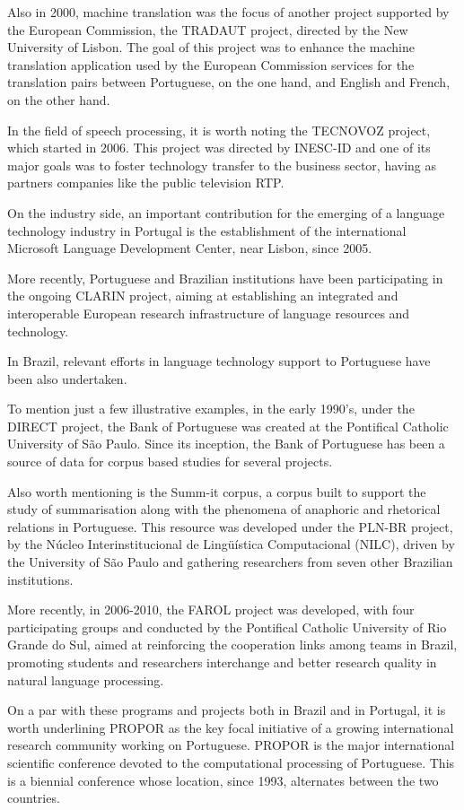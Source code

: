 \begin{multicols}{2}
Also in 2000, machine translation was the focus of another project supported by the European Commission,
the TRADAUT project, directed by the New University of Lisbon. The goal of this project
was to enhance the machine translation application used by the European Commission services
for the translation pairs between Portuguese, on the one hand, and English and French, on the other hand.

In the field of speech processing, it is worth noting the TECNOVOZ project, which started in 2006.
This project was directed by INESC-ID and one of its major goals was to foster technology
transfer to the business sector, having as partners companies like the public television RTP.

On the industry side, an important contribution for the emerging of a language technology industry in Portugal is the establishment of the international Microsoft Language Development Center, near Lisbon, since 2005.

More recently, Portuguese and Brazilian institutions have been participating in the ongoing CLARIN project, aiming at establishing an integrated and interoperable European research infrastructure of language resources and technology.

In Brazil, relevant efforts in language technology support to Portuguese have been also undertaken. 

To mention just a few illustrative examples, in the early 1990's, under the DIRECT project, the Bank of Portuguese was created at the 
Pontifical Catholic University of São Paulo. Since its inception, the Bank of Portuguese has been a source of data for corpus based studies for several projects. 

Also worth mentioning is the Summ-it corpus, a corpus built to support the study of summarisation along with the phenomena of anaphoric and rhetorical relations in Portuguese. This resource was developed under the PLN-BR project, by the Núcleo Interinstitucional de Lingüística Computacional (NILC), driven by the University of São Paulo and gathering researchers from seven other Brazilian institutions. 

More recently, in 2006-2010, the FAROL project was developed, with four participating groups and conducted by the Pontifical Catholic University of Rio Grande do Sul, aimed at reinforcing the cooperation links among teams in Brazil, promoting students and researchers interchange and better research quality in natural language processing.

On a par with these programs and projects both in Brazil and in Portugal, it is worth underlining PROPOR
as the key focal initiative of a growing international research community
working on Portuguese. PROPOR is the major international scientific conference devoted
to the computational processing of Portuguese. This is a
biennial conference whose location, since 1993, alternates between the two countries.


\end{multicols}
